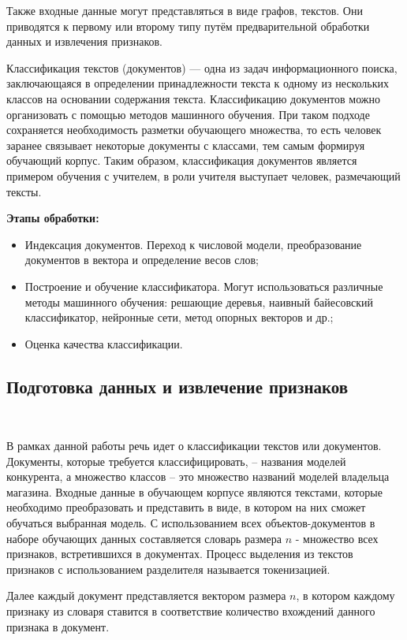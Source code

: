 Также входные данные могут представляться в виде графов, текстов. Они приводятся к первому или второму типу путём предварительной обработки данных и извлечения признаков.

Классификация текстов (документов) — одна из задач информационного поиска, заключающаяся в определении принадлежности текста к одному из нескольких классов на основании содержания текста. Классификацию документов можно организовать с помощью методов машинного обучения. При таком подходе сохраняется необходимость разметки обучающего множества, то есть человек заранее связывает некоторые документы с классами, тем самым формируя обучающий корпус. Таким образом, классификация документов является примером обучения с учителем, в роли учителя выступает человек, размечающий тексты. 

\textbf{Этапы обработки:}
\begin{itemize}
  \item Индексация документов. Переход к числовой модели, преобразование документов в вектора и определение весов слов;
  \item Построение и обучение классификатора. Могут использоваться различные методы машинного обучения: решающие деревья, наивный байесовский классификатор, нейронные сети, метод опорных векторов и др.;
  \item Оценка качества классификации.
\end{itemize}

\newpage
\subsection{Подготовка данных и извлечение признаков}
\

В рамках данной работы речь идет о классификации текстов или документов. Документы, которые требуется классифицировать, – названия моделей конкурента, а множество классов – это множество названий моделей владельца магазина. Входные данные в обучающем корпусе являются текстами, которые необходимо преобразовать и представить в виде, в котором на них сможет обучаться выбранная модель. С использованием всех объектов-документов в наборе обучающих данных составляется словарь размера $n$ - множество всех признаков, встретившихся в документах. Процесс выделения из текстов признаков с использованием разделителя называется токенизацией. 

Далее каждый документ представляется вектором размера $n$, в котором каждому признаку из словаря ставится в соответствие количество вхождений данного признака в документ.

